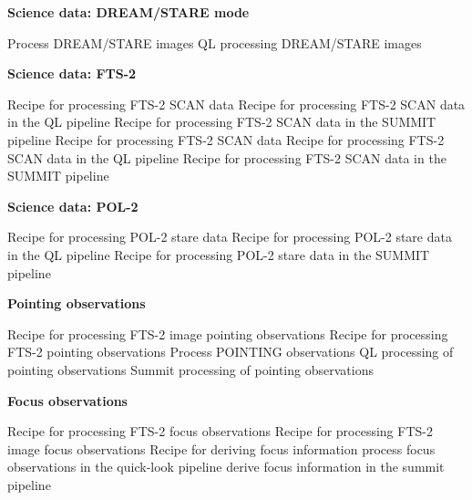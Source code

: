 \documentclass[twoside,11pt,nolof]{starlink}
\begin{document}
\begin{small}
{\large
\begin{center}
\textbf{Science data: DREAM/STARE mode}
\end{center}
}
\begin{description}
Process DREAM/STARE images
QL processing DREAM/STARE images
\end{description}

{\large
\begin{center}
\textbf{Science data: FTS-2}
\end{center}
}
\begin{description}
Recipe for processing FTS-2 SCAN data
Recipe for processing FTS-2 SCAN data in the QL pipeline
Recipe for processing FTS-2 SCAN data in the SUMMIT pipeline
Recipe for processing FTS-2 SCAN data
Recipe for processing FTS-2 SCAN data in the QL pipeline
Recipe for processing FTS-2 SCAN data in the SUMMIT pipeline
\end{description}

{\large
\begin{center}
\textbf{Science data: POL-2}
\end{center}
}
\begin{description}
Recipe for processing POL-2 stare data
Recipe for processing POL-2 stare data in the QL pipeline
Recipe for processing POL-2 stare data in the SUMMIT pipeline
\end{description}

{\large
\begin{center}
\textbf{Pointing observations}
\end{center}
}
\begin{description}
Recipe for processing FTS-2 image pointing observations
Recipe for processing FTS-2 pointing observations
Process POINTING observations
QL processing of pointing observations
Summit processing of pointing observations
\end{description}

{\large
\begin{center}
\textbf{Focus observations}
\end{center}
}
\begin{description}
Recipe for processing FTS-2 focus observations
Recipe for processing FTS-2 image focus observations
Recipe for deriving focus information
process focus observations in the quick-look pipeline
derive focus information in the summit pipeline
\end{description}


\end{small}
\end{document}

